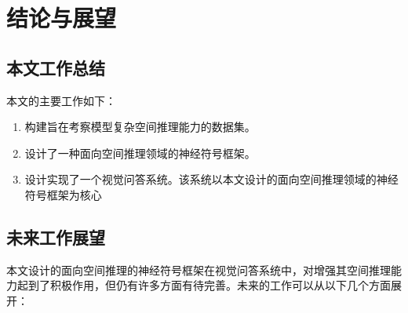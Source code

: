 \chapter{结论与展望}
\section{本文工作总结}
本文的主要工作如下：
\begin{enumerate}
\item 构建旨在考察模型复杂空间推理能力的数据集。
\item 设计了一种面向空间推理领域的神经符号框架。
\item 设计实现了一个视觉问答系统。该系统以本文设计的面向空间推理领域的神经符号框架为核心
\end{enumerate}
\section{未来工作展望}
本文设计的面向空间推理的神经符号框架在视觉问答系统中，对增强其空间推理能力起到了积极作用，但仍有许多方面有待完善。未来的工作可以从以下几个方面展开：